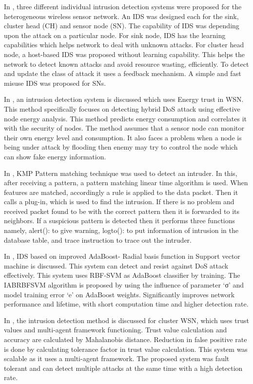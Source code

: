 \par
In \cite{wang2011integrated}, three different individual intrusion detection systems were proposed for the heterogeneous wireless sensor network. An IDS was designed each for the sink, cluster head (CH) and sensor node (SN). The capability of IDS was depending upon the attack on a particular node. For sink node, IDS has the learning capabilities which helps network to deal with unknown attacks. For cluster head node, a host-based IDS was proposed without learning capability. This helps the network to detect known attacks and avoid resource wasting, efficiently. To detect and update the class of attack it uses a feedback mechanism. A simple and fast misuse IDS was proposed for SNs.
\par
In \cite{jinhui2018intrusion}, an intrusion detection system is discussed which uses Energy trust in WSN. This method specifically focuses on detecting hybrid DoS attack using effective node energy analysis. This method predicts energy consumption and correlates it with the security of nodes. The method assumes that a sensor node can monitor their own energy level and consumption. It also faces a problem when a node is being under attack by flooding then enemy may try to control the node which can show fake energy information.
\par
In \cite{kalnoor2018detection}, KMP Pattern matching technique was used to detect an intruder. In this, after receiving a pattern, a pattern matching linear time algorithm is used. When features are matched, accordingly a rule is applied to the data packet. Then it calls a plug-in, which is used to find the intrusion. If there is no problem and received packet found to be with the correct pattern then it is forwarded to its neighbors. If a suspicious pattern is detected then it performs three functions namely, alert(): to give warning, logto(): to put information of intrusion in the database table, and trace instruction to trace out the intruder.
\par
In \cite{jianjian2018novel},  IDS based on improved AdaBoost- Radial basis function in Support vector machine is discussed. This system can detect and resist against DoS attack effectively. This system uses RBF-SVM as AdaBoost classifier by training. The IABRBFSVM algorithm is proposed by using the influence of parameter ‘σ’ and model training error ‘e’ on AdaBoost weights. Significantly improves network performance and lifetime, with short computation time and higher detection rate.
\par
In \cite{jin2017multi}, the intrusion detection method is discussed for cluster WSN, which uses trust values and multi-agent framework functioning. Trust value calculation and accuracy are calculated by Mahalanobis distance. Reduction in false positive rate is done by calculating tolerance factor in trust value calculation. This system was scalable as it uses a multi-agent framework. The proposed system was fault tolerant and can detect multiple attacks at the same time with a high detection rate.
